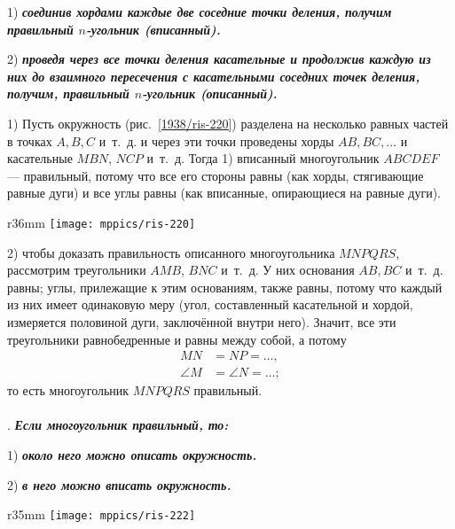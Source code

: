 1) \textbf{\emph{соединив хордами каждые две соседние точки деления, получим правильный $n$-угольник (вписанный).}}

2) \textbf{\emph{проведя через все точки деления касательные и продолжив каждую из них до взаимного пересечения с касательными соседних точек деления, получим, правильный $n$-угольник (описанный).}}


1) Пусть окружность (рис.~\ref{1938/ris-220}) разделена на несколько равных частей в точках $A, B, C$ и~т.~д.
и через эти точки проведены хорды $AB, BC,\dots$
и касательные $MBN$, $NCP$ и~т.~д.
Тогда 1) вписанный многоугольник $ABCDEF$ — правильный, потому что все его стороны равны (как хорды, стягивающие равные дуги) и все углы равны (как вписанные, опирающиеся на равные дуги).

\begin{wrapfigure}{r}{36mm}
\centering
\texttt{[image: mppics/ris-220]}
\caption{}\label{1938/ris-220}
\end{wrapfigure}

2) чтобы доказать правильность описанного многоугольника $MNPQRS$, рассмотрим треугольники $AMB$, $BNC$ и~т.~д.
У них основания $AB, BC$ и~т.~д.
равны;
углы, прилежащие к этим основаниям, также равны, потому что каждый из них имеет одинаковую меру (угол, составленный касательной и хордой, измеряется половиной дуги, заключённой внутри него).
Значит, все эти треугольники равнобедренные и равны между собой, а потому 
\begin{align*}
MN&=NP=\dots,
\\
\angle M&=\angle N=\dots;
\end{align*}
то есть многоугольник $MNPQRS$ правильный.

\paragraph{}\label{1938/215}
.
\textbf{\emph{Если многоугольник правильный, то:}}

1) \textbf{\emph{около него можно описать окружность.}}

2) \textbf{\emph{в него можно вписать окружность.}}

\begin{wrapfigure}{r}{35mm}
\centering
\texttt{[image: mppics/ris-222]}
\caption{}\label{1938/ris-222}
\end{wrapfigure}

